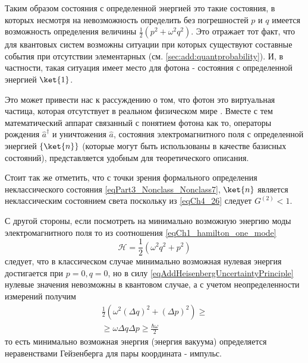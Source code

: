 \begin{remark}
  Таким образом состояния с определенной энергией это такие состояния,
  в которых несмотря на невозможность определить без погрешностей $p$
  и $q$ имеется возможность определения величины 
  \(
  \frac{1}{2} \left(p^2 +
  \omega^2q^2\right)
  \). Это отражает тот факт, что для квантовых систем возможны
  ситуации при которых существуют составные события при отсутствии
  элементарных (см. \autoref{sec:add:quantprobability}). 
  И, в частности, такая ситуация имеет место для фотона
  - состояния с определенной энергией $\ket{1}$.

  Это может привести нас к рассуждению о том, что фотон это
  виртуальная частица, которая отсутствует в реальном физическом мире
  \cite{Lamb1995}. Вместе с тем математический аппарат связанный с
  понятием фотона как то, операторы рождения $\hat{a}^\dag$ и
  уничтожения $\hat{a}$, состояния электромагнитного поля с
  определенной энергией $\{\ket{n}\}$ (которые могут быть
  использованы в качестве базисных состояний), представляется удобным
  для теоретического описания.

  Стоит так же отметить, что с точки зрения формального определения
  неклассического состояния \eqref{eqPart3_Nonclass_Nonclass7},
  $\ket{n}$ является неклассическим 
  состоянием света поскольку из \eqref{eqCh4_26} следует $G^{(2)} <
  1$.

  С другой стороны, если посмотреть на минимально возможную энергию
  моды электромагнитного поля то из соотношения
  \eqref{eqCh1_hamilton_one_mode} 
  \[
  \mathcal{H} = \frac{1}{2}\left(\omega^2 q^2 + p^2\right)
  \]
  следует, что в классическом случае минимально возможная нулевая
  энергия достигается при $p = 0, q=0$, но в силу
  \eqref{eqAddHeisenbergUncertaintyPrinciple} нулевые значения
  невозможны в квантовом случае, а с учетом неопределенности измерений
  получим 
  \begin{eqnarray}
    \frac{1}{2}\left(\omega^2 (\Delta q)^2 + (\Delta p)^2\right) \ge
    \nonumber \\
    \ge \omega \Delta q \Delta p \ge \frac{\hbar \omega}{2}
    \nonumber
  \end{eqnarray}
  то есть минимально возможная энергия (энергия вакуума) определяется
  неравенствами Гейзенберга для пары координата - импульс.  
  \label{rem:antiphoton}
\end{remark}
